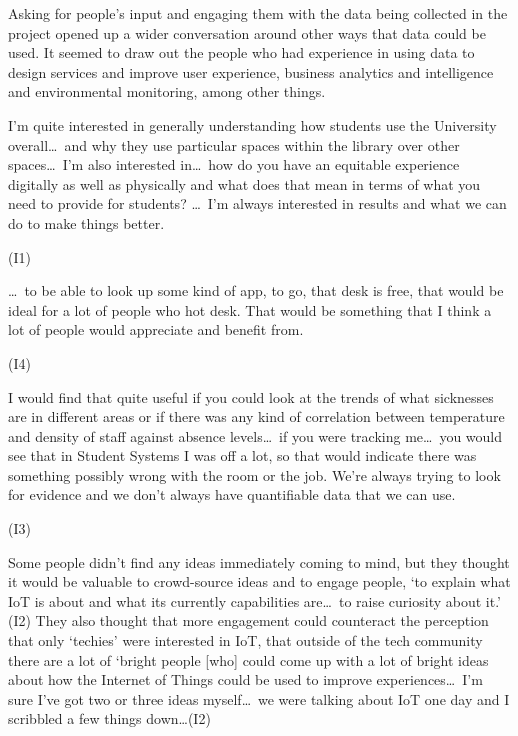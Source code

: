 Asking for people’s input and engaging them with the data being
collected in the project opened up a wider conversation around other
ways that data could be used. It seemed to draw out the people who had
experience in using data to design services and improve user
experience, business analytics and intelligence and environmental
monitoring, among other things.

\begin{qt}I’m quite interested in generally understanding how students use the
University overall\ldots\  and why they use particular spaces within the
library over other spaces\ldots\  I’m also interested in\ldots\  how do you have an
equitable experience digitally as well as physically and what does
that mean in terms of what you need to provide for students? \ldots\  I’m always interested in results and what we can
do to make things better.\end{qt} (I1)

\begin{qt}\ldots\  to be able to look up some kind of app, to go, that desk is free,
that would be ideal for a lot of people who hot desk. That would be
something that I think a lot of people would appreciate and benefit
from.\end{qt} (I4)

\begin{qt}I would find that quite useful if you could look at the trends of
what sicknesses are in different areas or if there was any kind of
correlation between temperature and density of staff against absence
levels\ldots\  if you were tracking me\ldots\ you would see that in Student Systems I was off a lot, so that
would indicate there was something possibly wrong with the room or the
job. We’re always trying to look for evidence and
we don’t always have quantifiable data that we can use.\end{qt} (I3)

Some people didn’t find any ideas immediately coming to mind, but they
thought it would be valuable to crowd-source ideas and to engage people, ‘to explain what IoT is about and what its currently capabilities are\ldots\  to raise curiosity about it.’ (I2) They also thought that more engagement could counteract the perception that only ‘techies’ were interested in IoT, that outside of the tech community there are a lot of ‘bright people [who] could come up with a lot of bright ideas about how the
Internet of Things could be used to improve experiences\ldots\ I’m sure I’ve got two or three ideas myself\ldots\  we were talking about IoT one day and I scribbled a few
things down\ldots (I2)

